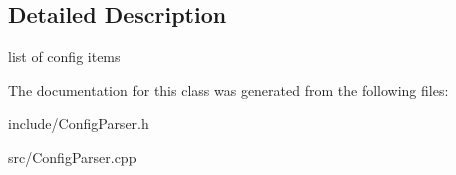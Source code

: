 \subsection{Detailed Description}
list of config items 

The documentation for this class was generated from the following files\+:\begin{DoxyCompactItemize}
\item 
include/Config\+Parser.\+h\item 
src/Config\+Parser.\+cpp\end{DoxyCompactItemize}
